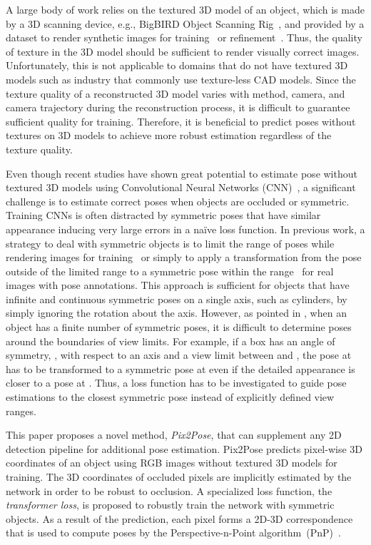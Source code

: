 \documentclass[10pt,twocolumn,letterpaper]{article}
\begin{document}
A large body of work relies on the textured 3D model of an object, which is made by a 3D scanning device, e.g., BigBIRD Object Scanning Rig~\cite{alli2015YCB}, and provided by a dataset to render synthetic images for training~\cite{kehl2017ssd, Sundermeyer_2018_ECCV_implicit} or refinement~\cite{Li_2018_DeepIM, Manhardt_2018_ECCV_refinementTUM}. Thus, the quality of texture in the 3D model should be sufficient to render visually correct images. Unfortunately, this is not applicable to domains that do not have textured 3D models such as industry that commonly use texture-less CAD models. Since the texture quality of a reconstructed 3D model varies with method, camera, and camera trajectory during the reconstruction process, it is difficult to guarantee sufficient quality for training. Therefore, it is beneficial to predict poses without textures on 3D models to achieve more robust estimation regardless of the texture quality. 

Even though recent studies have shown great potential to estimate pose without textured 3D models using Convolutional Neural Networks (CNN)~\cite{cnn_pose:brachmann2016uncertainty_only_rgb,Do2018LieNetRM,rad2017bb8,Tekin_2018_CVPR}, a significant challenge is to estimate correct poses when objects are occluded or symmetric. Training CNNs is often distracted by symmetric poses that have similar appearance inducing very large errors in a na\"ive loss function. In previous work, a strategy to deal with symmetric objects is to limit the range of poses while rendering images for training~\cite{kehl2017ssd,Oberweger_2018_ECCV_heatmap} or simply to apply a transformation from the pose outside of the limited range to a symmetric pose within the range~\cite{rad2017bb8} for real images with pose annotations. This approach is sufficient for objects that have infinite and continuous symmetric poses on a single axis, such as cylinders, by simply ignoring the rotation about the axis. However, as pointed in \cite{rad2017bb8}, when an object has a finite number of symmetric poses, it is difficult to determine poses around the boundaries of view limits. For example, if a box has an angle of symmetry, , with respect to an axis and a view limit between  and , the pose at  has to be transformed to a symmetric pose at  even if the detailed appearance is closer to a pose at . Thus, a loss function has to be investigated to guide pose estimations to the closest symmetric pose instead of explicitly defined view ranges. 

This paper proposes a novel method, \textit{Pix2Pose}, that can supplement any 2D detection pipeline for additional pose estimation. Pix2Pose predicts pixel-wise 3D coordinates of an object using RGB images without textured 3D models for training. The 3D coordinates of occluded pixels are implicitly estimated by the network in order to be robust to occlusion. A specialized loss function, the \textit{transformer loss}, is proposed to robustly train the network with symmetric objects. As a result of the prediction, each pixel forms a 2D-3D correspondence that is used to compute poses by the Perspective-n-Point algorithm~(PnP)~\cite{Lepetit2008epnp}. 
\end{document}

